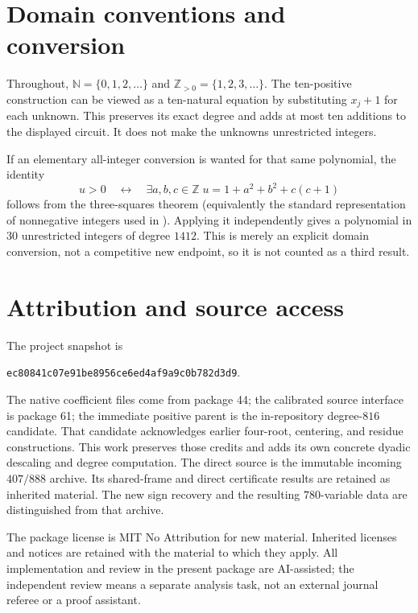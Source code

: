 \documentclass[11pt,letterpaper]{article}
\newcommand{\Z}{\mathbb Z}
\newcommand{\N}{\mathbb N}
\newcommand{\Pos}{\mathbb Z_{>0}}
\newcommand{\sha}{\texttt{ec80841c07e91be8956ce6ed4af9a9c0b782d3d9}}
\theoremstyle{definition}
\theoremstyle{remark}
\numberwithin{equation}{section}
\begin{document}
\appendix
\section{Domain conventions and conversion}

Throughout, $\N=\{0,1,2,\ldots\}$ and $\Pos=\{1,2,3,\ldots\}$.
The ten-positive construction can be viewed as a ten-natural equation
by substituting $x_j+1$ for each unknown. This preserves its exact degree
and adds at most ten additions to the displayed circuit.
It does not make the unknowns unrestricted integers.

If an elementary all-integer conversion is wanted for that same
polynomial, the identity
\[
 u>0\quad\longleftrightarrow\quad
 \exists a,b,c\in\Z\;u=1+a^2+b^2+c(c+1)
\]
follows from the three-squares theorem (equivalently the standard
representation of nonnegative integers used in \cite{sun2026}).
Applying it independently gives a polynomial in $30$ unrestricted
integers of degree $1412$. This is merely an explicit domain conversion,
not a competitive new endpoint, so it is not counted as a third result.

\section{Attribution and source access}

The project snapshot is
\begin{center}\small\sha.\end{center}
The native coefficient files come from package 44; the calibrated source
interface is package 61; the immediate positive parent is the in-repository
degree-$816$ candidate. That candidate acknowledges earlier four-root,
centering, and residue constructions. This work preserves those credits
and adds its own concrete dyadic descaling and degree computation.
The direct source is the immutable incoming $407/888$ archive. Its
shared-frame and direct certificate results are retained as inherited
material. The new sign recovery and the resulting $780$-variable data
are distinguished from that archive.

The package license is MIT No Attribution for new material. Inherited
licenses and notices are retained with the material to which they apply.
All implementation and review in the present package are AI-assisted;
the independent review means a separate analysis task, not an external
journal referee or a proof assistant.
\end{document}
